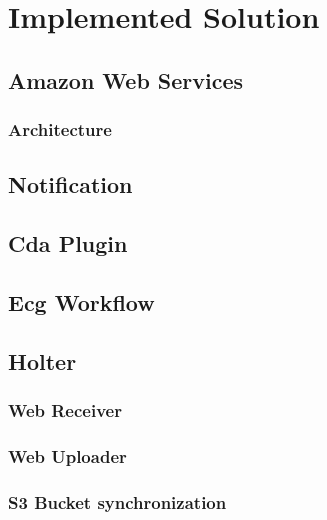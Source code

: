 \chapter{Implemented Solution}
\section{Amazon Web Services}
\subsection{Architecture}
\section{Notification}
\section{Cda Plugin}
\section{Ecg Workflow}
\section{Holter}
\subsection{Web Receiver}
\subsection{Web Uploader}
\subsection{S3 Bucket synchronization}